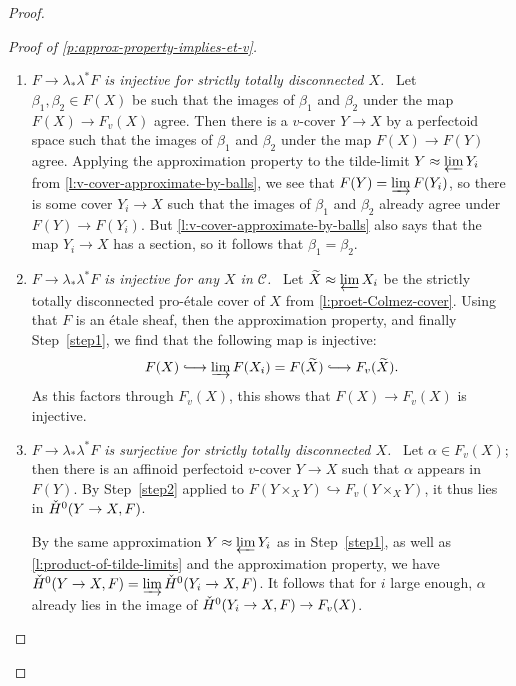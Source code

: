 \documentclass[11pt]{amsart}
\numberwithin{equation}{section}
\theoremstyle{definition}
\theoremstyle{remark}
\newcommand*{\longhookrightarrow}{\lhook\joinrel\longrightarrow}
\newcommand{\wt}{\widetilde}
\newcommand{\cH}{{\ifmmode \check{H}\else{\v{C}ech}\fi}}
\begin{document}
\begin{proof}
\begin{proof}[Proof of \cref{p:approx-property-implies-et-v}]
\begin{enumerate}[label={\emph{Step}~\arabic*:}, ref=\arabic*,wide]
\item\label{step1} \emph{$F\to \lambda_{\ast}\lambda^{\ast}F$ is injective for strictly totally disconnected $X$.}~
		Let $\beta_1,\beta_2\in F(X)$ be such that the images of $\beta_1$ and $\beta_2$ under the map $F(X)\to F_v(X)$ agree. Then there is a $v$-cover $Y\to X$ by a perfectoid space such that the images of $\beta_1$ and $\beta_2$ under the map $F(X)\to F(Y)$ agree. Applying the approximation property to  the tilde-limit $Y\approx \varprojlim Y_i$ from \cref{l:v-cover-approximate-by-balls}, we see that $F(Y)=\varinjlim F(Y_i)$,
		so there is some cover $Y_i\to X$ such that the images of $\beta_1$ and $\beta_2$ already agree under  $F(Y)\to F(Y_i)$. But \cref{l:v-cover-approximate-by-balls} also says that the map $Y_i\to X$ has a section,  so it follows that $\beta_1=\beta_2$.

\item\label{step2} \emph{$F\to \lambda_{\ast}\lambda^{\ast}F$ is injective for any $X$ in $\mathcal C$.}~
		Let $\wt X\approx \varprojlim X_i$ be the strictly totally disconnected pro-\'etale cover of $X$ from \cref{l:proet-Colmez-cover}. Using that $F$ is an \'etale sheaf, then the approximation property, and finally Step~\ref{step1}, we find that the following map is injective:
		\[F(X)\longhookrightarrow \varinjlim F(X_i)=F(\wt X)\longhookrightarrow F_v(\wt X).\]
		As this factors through $F_v(X)$, this shows that $F(X)\to F_v(X)$ is injective. 
		
\item\label{step3} \emph{$F\to \lambda_{\ast}\lambda^{\ast}F$ is surjective for strictly totally disconnected $X$.}~
		Let $\alpha \in F_v(X)$; then there is an affinoid perfectoid $v$-cover $Y\to X$ such that $\alpha$ appears in $F(Y)$. By Step~\ref{step2} applied to $F(Y\times_XY)\hookrightarrow F_v(Y\times_XY)$, it thus lies in $\cH^0(Y\to X,F)$.
		
		 By the same approximation $Y\approx\varprojlim Y_i$ as in Step~\ref{step1}, as well as \cref{l:product-of-tilde-limits} and the approximation property, we have $\cH^0(Y\to X,F)=\varinjlim \cH^0(Y_i\to X,F)$. It follows that for $i$ large enough, $\alpha$ already lies in the image of 
		$\cH^0(Y_i\to X,F)\to F_v(X)$.
		

\end{enumerate}
\end{proof}
\end{proof}
\end{document}
